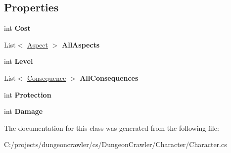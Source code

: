 \subsection*{Properties}
\begin{DoxyCompactItemize}
\item 
\hypertarget{class_dungeon_crawler_1_1_character_1_1_character_abff341ec0c5d7942538adf71771db9c0}{}int {\bfseries Cost}\label{class_dungeon_crawler_1_1_character_1_1_character_abff341ec0c5d7942538adf71771db9c0}

\item 
\hypertarget{class_dungeon_crawler_1_1_character_1_1_character_a970c74df860573bf88cfa26f6557142f}{}List$<$ \hyperlink{class_dungeon_crawler_1_1_core_1_1_aspect}{Aspect} $>$ {\bfseries All\+Aspects}\label{class_dungeon_crawler_1_1_character_1_1_character_a970c74df860573bf88cfa26f6557142f}

\item 
\hypertarget{class_dungeon_crawler_1_1_character_1_1_character_a93b94f2dac65fe44d2834035e3ea74c9}{}int {\bfseries Level}\label{class_dungeon_crawler_1_1_character_1_1_character_a93b94f2dac65fe44d2834035e3ea74c9}

\item 
\hypertarget{class_dungeon_crawler_1_1_character_1_1_character_a4f17349415eb456f583217a8a53257fa}{}List$<$ \hyperlink{class_dungeon_crawler_1_1_character_1_1_consequence}{Consequence} $>$ {\bfseries All\+Consequences}\label{class_dungeon_crawler_1_1_character_1_1_character_a4f17349415eb456f583217a8a53257fa}

\item 
\hypertarget{class_dungeon_crawler_1_1_character_1_1_character_aea7275f0f81c59594d15852f3c1bc5ef}{}int {\bfseries Protection}\label{class_dungeon_crawler_1_1_character_1_1_character_aea7275f0f81c59594d15852f3c1bc5ef}

\item 
\hypertarget{class_dungeon_crawler_1_1_character_1_1_character_a3c018d2c63b73a6857252410772f65dd}{}int {\bfseries Damage}\label{class_dungeon_crawler_1_1_character_1_1_character_a3c018d2c63b73a6857252410772f65dd}

\end{DoxyCompactItemize}


The documentation for this class was generated from the following file\+:\begin{DoxyCompactItemize}
\item 
C\+:/projects/dungeoncrawler/cs/\+Dungeon\+Crawler/\+Character/Character.\+cs\end{DoxyCompactItemize}
